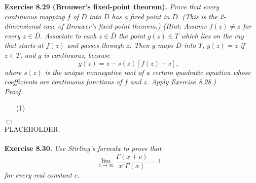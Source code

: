\documentclass{article}
\begin{document}



\textbf{Exercise 8.29 (Brouwer's fixed-point theorem).}
\emph{Prove that every continuous mapping $f$ of $\overline{D}$ into $\overline{D}$
has a fixed point in $\overline{D}$.
(This is the 2-dimensional case of Brouwer's fixed-point theorem.)
(Hint: Assume $f(z) \neq z$ for every $z \in \overline{D}$.
Associate to each $z \in \overline{D}$ the point $g(z) \in T$
which lies on the ray that starts at $f(z)$ and passes through $z$.
Then $g$ maps $\overline{D}$ into $T$,
$g(z) = z$ if $z \in T$, and $g$ is continuous,
because
\[
  g(z) = z - s(z)[f(z)-z],
\]
where $s(z)$ is the unique nonnegative root of a certain quadratic equation whose
coefficients are continuous functions of $f$ and $z$.
Apply Exercise 8.28.)} \\

\emph{Proof.}
\begin{enumerate}
  \item[(1)]
\end{enumerate}
$\Box$ \\



PLACEHOLDER. \\\\






\textbf{Exercise 8.30.}
\emph{Use Stirling's formula to prove that
\[
  \lim_{x \to \infty} \frac{\Gamma(x+c)}{x^c \Gamma(x)} = 1
\]
for every real constant $c$.} \\
\end{document}
